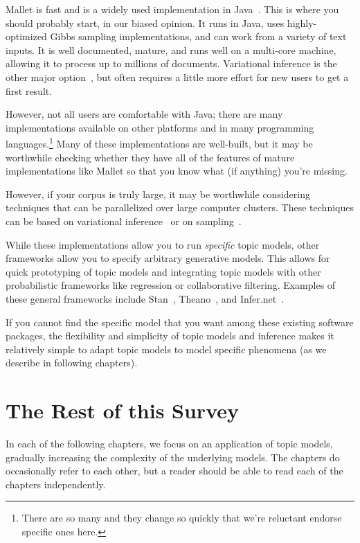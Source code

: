 Mallet is fast and is a widely used implementation in Java~\citep{mallet}.  This
is where you should probably start, in our biased opinion.  It runs in Java, uses
highly-optimized Gibbs sampling implementations, and can work from a variety of
text inputs.  It is well documented, mature, and runs well on a multi-core
machine, allowing it to process up to millions of documents.  Variational
inference is the other major option~\citep{blei-03,vw}, but often requires a
little more effort for new users to get a first result.

However, not all users are comfortable with Java; there are many
implementations available on other platforms and in many programming
languages.\footnote{There are so many and they change so quickly that
  we're reluctant endorse specific ones here.}  Many of these
implementations are well-built, but it may be worthwhile checking
whether they have all of the features of mature implementations like
Mallet so that you know what (if anything) you're missing.

However, if your corpus is truly large, it may be worthwhile
considering techniques that can be parallelized over large computer
clusters.  These techniques can be based on variational
inference~\citep{Narayanamurthy-11,zhai-12} or on
sampling~\citep{newman-08}.

While these implementations allow you to run \emph{specific} topic
models, other frameworks allow you to specify arbitrary generative
models.  This allows for quick prototyping of topic models and
integrating topic models with other probabilistic frameworks like
regression or collaborative filtering.  Examples of these general
frameworks include Stan~\citep{stan-software:2014},
Theano~\citep{theano}, and Infer.net~\citep{InferNET14}.

If you cannot find the specific model that you want among these
existing software packages, the flexibility and simplicity of topic
models and inference makes it relatively simple to adapt topic models
to model specific phenomena (as we describe in following chapters).

\section{The Rest of this Survey}

In each of the following chapters, we focus on an application of topic
models, gradually increasing the complexity of the underlying models.
The chapters do occasionally refer to each other, but a reader should
be able to read each of the chapters independently.

